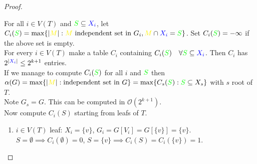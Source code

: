 \begin{proof}
\begin{center}
\begin{tikzpicture}[
            vertex/.style={circle, draw, fill=gray!20, minimum size=1mm, inner sep=0pt},
            bundle/.style={circle, draw, fill=cyan!20, minimum size=3mm, inner sep=0pt}
            ]
            \end{tikzpicture}
    \end{center}
    For all $i\in V(T)$ and $\textcolor{green}{S}\subseteq \textcolor{blue}{X_i}$, let $C_i(\textcolor{green}{S})=\max\{|\textcolor{yellow}{M}|:\textcolor{yellow}{M}\text{ independent set in }G_i,\textcolor{yellow}{M}\cap \textcolor{blue}{X_i}=\textcolor{green}{S}\}$. Set $C_i(\textcolor{green}{S})=-\infty$ if the above set is empty.\\
    For every $i\in V(T)$ make a table $C_i$ containing $C_i(\textcolor{green}{S})\quad \forall \textcolor{green}{S}\subseteq \textcolor{blue}{X_i}$. Then $C_i$ has $2^{|\textcolor{blue}{X_i}|}\leq 2^{k+1}$ entries.\\
    If we manage to compute $C_i(\textcolor{green}{S})$ for all $i$ and $\textcolor{green}{S}$ then $\alpha(G)=\max\{|\textcolor{yellow}{M}|: \text{independent set in }G\}=\max\{C_s(\textcolor{green}{S}): \textcolor{green}{S}\subseteq X_s\}$ with $s$ root of $T$.\\
    Note $G_s=G$. This can be computed in $\mathcal{O}(2^{k+1})$.\\
    Now compute $C_i(S)$ starting from leafs of $T$.
    \begin{enumerate}
        \item $i\in V(T)$ leaf: $X_i=\{v\}$, $G_i=G[V_i]=G[\{v\}]=\{v\}$. $S=\emptyset\implies C_i(\emptyset)=0$, $S=\{v\}\implies C_i(S)=C_i(\{v\})=1$.
        \begin{center}
\end{center}
\end{enumerate}
\end{proof}
